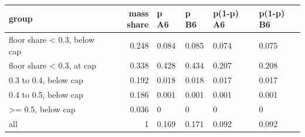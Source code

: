 \begingroup\small
\setlength{\tabcolsep}{3pt}
\renewcommand{\arraystretch}{1.04}
\begin{tabularx}{\linewidth}{XrXXXX}
\toprule
group & mass share & p A6 & p B6 & p(1-p) A6 & p(1-p) B6 \\
\midrule
floor share \textless{} 0.3, below cap & 0.248 & 0.084 & 0.085 & 0.074 & 0.075 \\
floor share \textless{} 0.3, at cap & 0.338 & 0.428 & 0.434 & 0.207 & 0.208 \\
0.3 to 0.4, below cap & 0.192 & 0.018 & 0.018 & 0.017 & 0.017 \\
0.4 to 0.5, below cap & 0.186 & 0.001 & 0.001 & 0.001 & 0.001 \\
\textgreater{}= 0.5, below cap & 0.036 & 0 & 0 & 0 & 0 \\
all & 1 & 0.169 & 0.171 & 0.092 & 0.092 \\
\bottomrule
\end{tabularx}
\endgroup
